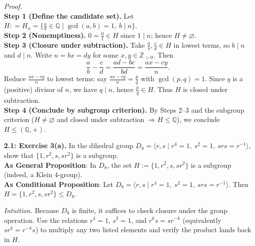 \documentclass[12pt]{article}
\theoremstyle{definition}
\begin{document}
\emph{Proof.}\\
\textbf{Step 1 (Define the candidate set).} Let $H\colon =H_n=\{\frac{a}{b}\in\mathbb Q \mid \gcd(a,b)=1,\ b\mid n\}$.\\
\textbf{Step 2 (Nonemptiness).} $0=\frac{0}{1}\in H$ since $1\mid n$; hence $H\neq\varnothing$.\\
\textbf{Step 3 (Closure under subtraction).} Take $\frac{a}{b},\frac{c}{d}\in H$ in lowest terms, so $b\mid n$ and $d\mid n$. Write $n=bx=dy$ for some $x,y\in\mathbb Z_{>0}$. Then
\[
\frac{a}{b}-\frac{c}{d}=\frac{ad-bc}{bd}=\frac{a x - c y}{n}.
\]
Reduce $\frac{a x - c y}{n}$ to lowest terms: say $\frac{a x - c y}{n}=\frac{p}{q}$ with $\gcd(p,q)=1$. Since $q$ is a (positive) divisor of $n$, we have $q\mid n$, hence $\frac{p}{q}\in H$. Thus $H$ is closed under subtraction.\\
\textbf{Step 4 (Conclude by subgroup criterion).} By Steps 2–3 and the subgroup criterion ($H\neq\varnothing$ and closed under subtraction $\Rightarrow H\le\mathbb Q$), we conclude $H\le(\mathbb Q,+)$.\\

\newpage

\newpage

\noindent \textbf{2.1: Exercise 3(a).} In the dihedral group $D_8=\langle r,s\mid r^4=1,\ s^2=1,\ srs=r^{-1}\rangle$, show that $\{1,r^2,s,sr^2\}$ is a subgroup.\\ %

\noindent\textbf{As General Proposition}: In $D_8$, the set $H:=\{1,r^2,s,sr^2\}$ is a subgroup (indeed, a Klein $4$-group).\\

\noindent \textbf{As Conditional Proposition}: Let $D_8=\langle r,s\mid r^4=1,\ s^2=1,\ srs=r^{-1}\rangle$. Then $H=\{1,r^2,s,sr^2\}\le D_8$.

\newpage

\dotfill

\emph{Intuition.} Because $D_8$ is finite, it suffices to check closure under the group operation. Use the relations $r^4=1$, $s^2=1$, and $r^k s=s r^{-k}$ (equivalently $s r^k=r^{-k}s$) to multiply any two listed elements and verify the product lands back in $H$.\\

\dotfill
\end{document}
